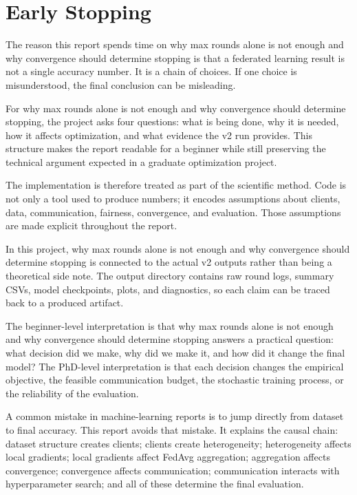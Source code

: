 \documentclass[11pt]{report}
\begin{document}
\chapter{Early Stopping}
The reason this report spends time on why max rounds alone is not enough and why convergence should
determine stopping is that a federated learning result is not a single accuracy number. It is a
chain of choices. If one choice is misunderstood, the final conclusion can be misleading.

For why max rounds alone is not enough and why convergence should determine stopping, the project
asks four questions: what is being done, why it is needed, how it affects optimization, and what
evidence the v2 run provides. This structure makes the report readable for a beginner while still
preserving the technical argument expected in a graduate optimization project.

The implementation is therefore treated as part of the scientific method. Code is not only a tool
used to produce numbers; it encodes assumptions about clients, data, communication, fairness,
convergence, and evaluation. Those assumptions are made explicit throughout the report.

In this project, why max rounds alone is not enough and why convergence should determine stopping is
connected to the actual v2 outputs rather than being a theoretical side note. The output directory
contains raw round logs, summary CSVs, model checkpoints, plots, and diagnostics, so each claim can
be traced back to a produced artifact.

The beginner-level interpretation is that why max rounds alone is not enough and why convergence
should determine stopping answers a practical question: what decision did we make, why did we make
it, and how did it change the final model? The PhD-level interpretation is that each decision
changes the empirical objective, the feasible communication budget, the stochastic training process,
or the reliability of the evaluation.

A common mistake in machine-learning reports is to jump directly from dataset to final accuracy.
This report avoids that mistake. It explains the causal chain: dataset structure creates clients;
clients create heterogeneity; heterogeneity affects local gradients; local gradients affect FedAvg
aggregation; aggregation affects convergence; convergence affects communication; communication
interacts with hyperparameter search; and all of these determine the final evaluation.
\end{document}
